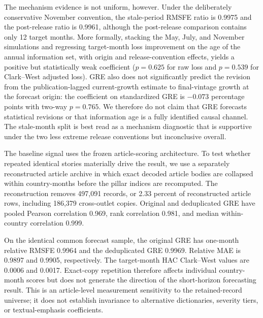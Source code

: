 \documentclass[preprint,12pt,authoryear]{elsarticle}
\begin{document}


The mechanism evidence is not uniform, however. Under the deliberately conservative November convention, the stale-period RMSFE ratio is 0.9975 and the post-release ratio is 0.9961, although the post-release comparison contains only 12 target months. More formally, stacking the May, July, and November simulations and regressing target-month loss improvement on the age of the annual information set, with origin and release-convention effects, yields a positive but statistically weak coefficient ($p=0.625$ for raw loss and $p=0.539$ for Clark--West adjusted loss). GRE also does not significantly predict the revision from the publication-lagged current-growth estimate to final-vintage growth at the forecast origin: the coefficient on standardized GRE is $-0.073$ percentage points with two-way $p=0.765$. We therefore do not claim that GRE forecasts statistical revisions or that information age is a fully identified causal channel. The stale-month split is best read as a mechanism diagnostic that is supportive under the two less extreme release conventions but inconclusive overall.

The baseline signal uses the frozen article-scoring architecture. To test whether repeated identical stories materially drive the result, we use a separately reconstructed article archive in which exact decoded article bodies are collapsed within country-months before the pillar indices are recomputed. The reconstruction removes 497,091 records, or 2.33 percent of reconstructed article rows, including 186,379 cross-outlet copies. Original and deduplicated GRE have pooled Pearson correlation 0.969, rank correlation 0.981, and median within-country correlation 0.999.



On the identical common forecast sample, the original GRE has one-month relative RMSFE 0.9964 and the deduplicated GRE 0.9969. Relative MAE is 0.9897 and 0.9905, respectively. The target-month HAC Clark--West values are 0.0006 and 0.0017. Exact-copy repetition therefore affects individual country-month scores but does not generate the direction of the short-horizon forecasting result. This is an article-level measurement sensitivity to the retained-record universe; it does not establish invariance to alternative dictionaries, severity tiers, or textual-emphasis coefficients.
\end{document}
